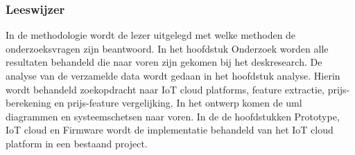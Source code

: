 \subsubsection{Leeswijzer}
In  de methodologie wordt de lezer uitgelegd met welke methoden de onderzoeksvragen zijn beantwoord. In het hoofdstuk Onderzoek worden alle resultaten behandeld die naar voren zijn gekomen bij het deskresearch. De analyse van de verzamelde data wordt gedaan in het hoofdstuk analyse. Hierin wordt behandeld zoekopdracht naar IoT cloud platforms, feature extractie, prijs-berekening en prijs-feature vergelijking. In het ontwerp komen de uml diagrammen en systeemschetsen naar voren. In de  de hoofdstukken Prototype, IoT cloud en Firmware wordt de implementatie behandeld van het IoT cloud platform in een bestaand project.




 
